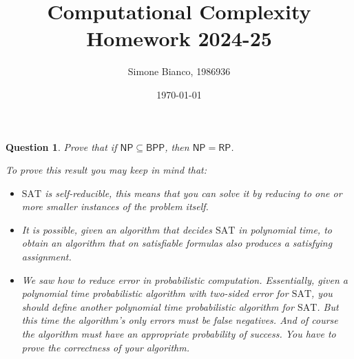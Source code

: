\documentclass[12pt,a4paper]{report}
\newtheorem{question}{Question}
\theoremstyle{definition}
\begin{document}
    \setlength{\parskip}{5pt}               %
    \setlength{\parindent}{0pt}             %

    \title{Computational Complexity \\ Homework 2024-25}
    \author{Simone Bianco, 1986936}
    \date{\today}

    \maketitle

    \begin{question}
        Prove that if $\mathsf{NP} \subseteq \mathsf{BPP}$, then $\mathsf{NP} = \mathsf{RP}$.
        
        To prove this result you may keep in mind that:
        \begin{itemize}
            \item $\mathrm{SAT}$ is self-reducible, this means that you can solve it by reducing to one or more smaller instances of the problem itself.
            \item It is possible, given an algorithm that decides $\mathrm{SAT}$ in polynomial time, to obtain an algorithm that on satisfiable formulas also produces a satisfying assignment.
            \item We saw how to reduce error in probabilistic computation. Essentially, given a polynomial time probabilistic algorithm with two-sided error for $\mathrm{SAT}$,
            you should define another polynomial time probabilistic algorithm for $\mathrm{SAT}$. But this time the algorithm's only errors must be false negatives. And of course the algorithm must have an appropriate probability of success. You have to prove the correctness of your algorithm.
        \end{itemize}
    \end{question}
\end{document}
